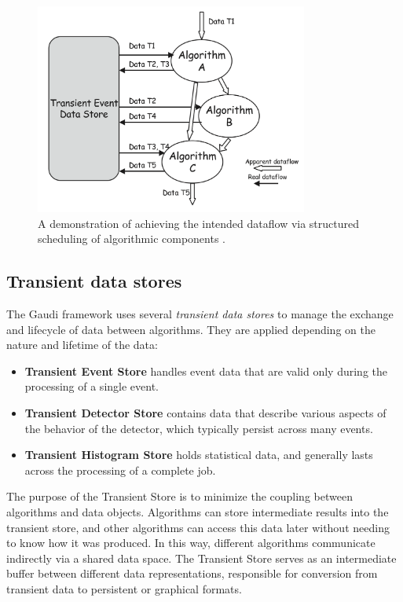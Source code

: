 \begin{figure}[htbp]
  \centering
  \includegraphics[width=0.8\textwidth]{figs/chapter3/Gaudi_dataflow.png}
  \caption{A demonstration of achieving the intended dataflow via structured scheduling of algorithmic components \cite{Gaudi}.}
  \label{fig:Gaudi_dataflow}
\end{figure}

\subsection{Transient data stores}
The Gaudi framework uses several \textit{transient data stores} to manage the exchange and lifecycle of data between algorithms. They are applied depending on the nature and lifetime of the data:

\begin{itemize}
    \item \textbf{Transient Event Store} handles event data that are valid only during the processing of a single event.
    \item \textbf{Transient Detector Store} contains data that describe various aspects of the behavior of the detector, which typically persist across many events.
    \item \textbf{Transient Histogram Store} holds statistical data, and generally lasts across the processing of a complete job.
\end{itemize}

The purpose of the Transient Store is to minimize the coupling between algorithms and data objects. Algorithms can store intermediate results into the transient store, and other algorithms can access this data later without needing to know how it was produced. In this way, different algorithms communicate indirectly via a shared data space. The Transient Store serves as an intermediate buffer between different data representations, responsible for conversion from transient data to persistent or graphical formats.

